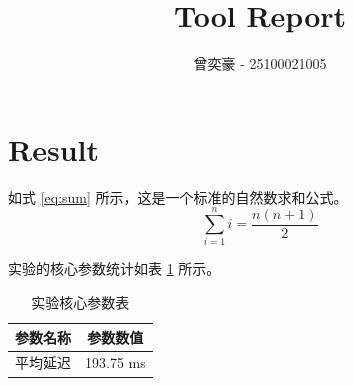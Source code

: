 \documentclass{article}
\begin{document}
\title{Tool Report}
\author{曾奕豪 - 25100021005}
\maketitle

\section{Result}

如式 \eqref{eq:sum} 所示，这是一个标准的自然数求和公式。
\begin{equation}
    \sum_{i=1}^{n} i = \frac{n(n+1)}{2}
    \label{eq:sum}  %
\end{equation}

实验的核心参数统计如表 \ref{tab:params} 所示。
\begin{table}[h]
    \centering %
    \caption{实验核心参数表} %
    \label{tab:params} %
    \begin{tabular}{|c|c|}
        \hline
        参数名称 & 参数数值 \\
        \hline
        平均延迟 & 193.75 ms \\
        \hline
    \end{tabular}
\end{table}
\end{document}
